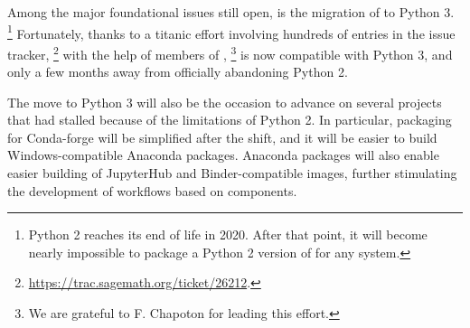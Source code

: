 \documentclass{deliverablereport}
\begin{document}
Among the major foundational issues still open, is the migration of
\Sage to Python 3.%
\footnote{Python 2 reaches its end of life in 2020. After that point,
  it will become nearly impossible to package a Python 2 version of
  \Sage for any system.} %
Fortunately, thanks to a titanic effort involving hundreds of entries
in the issue tracker,%
\footnote{\url{https://trac.sagemath.org/ticket/26212}.}  with the
help of members of \ODK,%
\footnote{We are grateful to F. Chapoton for leading this effort.}
\Sage is now compatible with Python 3, and only a few months away from
officially abandoning Python 2.

The move to Python 3 will also be the occasion to advance on several
projects that had stalled because of the limitations of Python 2. %
In particular, packaging for Conda-forge will be simplified after the
shift, and it will be easier to build Windows-compatible Anaconda
packages. %
Anaconda packages will also enable easier building of JupyterHub and
Binder-compatible images, further stimulating the development of
workflows based on \ODK components.
\end{document}
